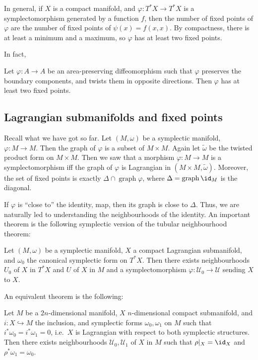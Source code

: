 \documentclass[a4paper]{article}
\DeclareMathOperator{\grph}{graph}
\begin{document}
In general, if $X$ is a compact manifold, and $\varphi: T^*X \to T^*X$ is a symplectomorphism generated by a function $f$, then the number of fixed points of $\varphi$ are the number of fixed points of $\psi(x) = f(x, x)$. By compactness, there is at least a minimum and a maximum, so $\varphi$ has at least two fixed points.

In fact,
\begin{thm}
  Let $\varphi: A \to A$ be an area-preserving diffeomorphism such that $\varphi$ preserves the boundary components, and twists them in opposite directions. Then $\varphi$ has at least two fixed points.
\end{thm}

\subsection{Lagrangian submanifolds and fixed points}
Recall what we have got so far. Let $(M, \omega)$ be a symplectic manifold, $\varphi: M \to M$. Then the graph of $\varphi$ is a subset of $M \times M$. Again let $\tilde{\omega}$ be the twisted product form on $M \times M$. Then we saw that a morphism $\varphi: M \to M$ is a symplectomorphism iff the graph of $\varphi$ is Lagrangian in $(M \times M, \tilde{\omega})$. Moreover, the set of fixed points is exactly $\Delta \cap \grph \varphi$, where $\Delta = \grph \id_M$ is the diagonal.

If $\varphi$ is ``close to'' the identity, map, then its graph is close to $\Delta$. Thus, we are naturally led to understanding the neighbourhoods of the identity. An important theorem is the following symplectic version of the tubular neighbourhood theorem:

\begin{thm}
  Let $(M, \omega)$ be a symplectic manifold, $X$ a compact Lagrangian submanifold, and $\omega_0$ the canonical symplectic form on $T^* X$. Then there exists neighbourhoods $U_0$ of $X$ in $T^* X$ and $U$ of $X$ in $M$ and a symplectomorphism $\varphi: \mathcal{U}_0 \to \mathcal{U}$ sending $X$ to $X$.
\end{thm}

An equivalent theorem is the following:
\begin{thm}[Weinstein]
  Let $M$ be a $2n$-dimensional manifold, $X$ $n$-dimensional compact submanifold, and $i: X \hookrightarrow M$ the inclusion, and symplectic forms $\omega_0, \omega_1$ on $M$ such that $i^* \omega_0 = i^* \omega_1 = 0$, i.e.\ $X$ is Lagrangian with respect to both symplectic structures. Then there exists neighbourhoods $\mathcal{U}_0, \mathcal{U}_1$ of $X$ in $M$ such that $\rho|_X = \id_X $ and $\rho^* \omega_1 = \omega_0$.
\end{thm}
\end{document}
